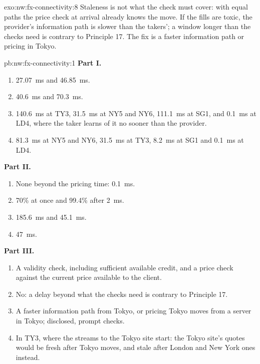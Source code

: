 \begin{solution}{exo:nw:fx-connectivity:8}
Staleness is not what the check must cover: with equal paths the price check at arrival already knows the move. If the fills are toxic,
the provider's information path is slower than the takers'; a window longer than the checks need is contrary to Principle 17. The fix is
a faster information path or pricing in Tokyo.
\end{solution}

\begin{solution}{pb:nw:fx-connectivity:1}
\textbf{Part I.}
\begin{enumerate}
\item \qty{27.07}{\milli\second} and \qty{46.85}{\milli\second}.
\item \qty{40.6}{\milli\second} and \qty{70.3}{\milli\second}.
\item \qty{140.6}{\milli\second} at TY3, \qty{31.5}{\milli\second} at NY5 and NY6, \qty{111.1}{\milli\second} at SG1, and
  \qty{0.1}{\milli\second} at LD4, where the taker learns of it no sooner than the provider.
\item \qty{81.3}{\milli\second} at NY5 and NY6, \qty{31.5}{\milli\second} at TY3, \qty{8.2}{\milli\second} at SG1 and
  \qty{0.1}{\milli\second} at LD4.
\end{enumerate}
\textbf{Part II.}
\begin{enumerate}[resume]
\item None beyond the pricing time: \qty{0.1}{\milli\second}.
\item 70\% at once and 99.4\% after \qty{2}{\milli\second}.
\item \qty{185.6}{\milli\second} and \qty{45.1}{\milli\second}.
\item \qty{47}{\milli\second}.
\end{enumerate}
\textbf{Part III.}
\begin{enumerate}[resume]
\item A validity check, including sufficient available credit, and a price check against the current price available to the client.
\item No: a delay beyond what the checks need is contrary to Principle 17.
\item A faster information path from Tokyo, or pricing Tokyo moves from a server in Tokyo; disclosed, prompt checks.
\item In TY3, where the streams to the Tokyo site start: the Tokyo site's quotes would be fresh after Tokyo moves, and stale after London
  and New York ones instead.

\end{enumerate}
\end{solution}
